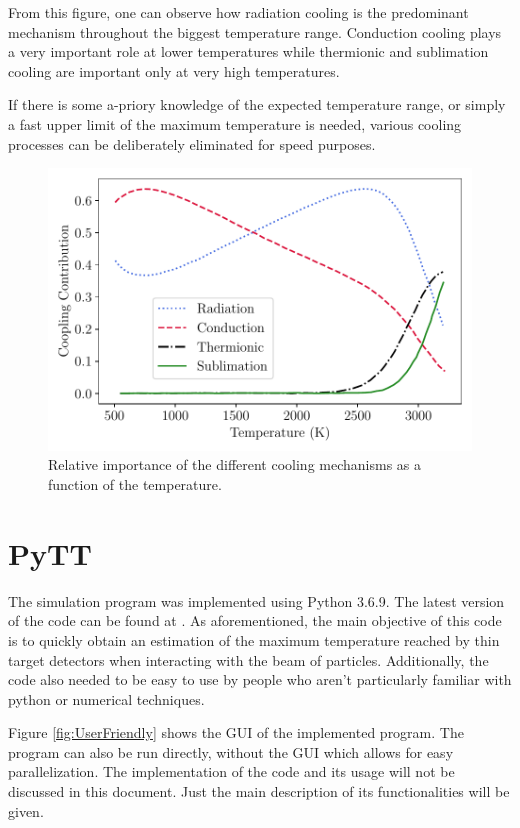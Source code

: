 From this figure, one can observe how radiation cooling is the predominant mechanism throughout the biggest temperature range. Conduction cooling plays a very important role at lower temperatures while thermionic and sublimation cooling are important only at very high temperatures. 

If there is some a-priory knowledge of the expected temperature range, or simply a fast upper limit of the maximum temperature is needed, various cooling processes can be deliberately eliminated for speed purposes.

\begin{figure}[h]
    \centering
    \includegraphics[width=0.60\columnwidth]{PlotCoolingImportancfe/CoolingImpo.pdf}
    \caption{Relative importance of the different cooling mechanisms as a function of the temperature.}
    \label{fig:CoolingComparison}
\end{figure}

\section{PyTT}

The simulation program was implemented using Python 3.6.9. The latest version of the code can be found at \parencite[][]{ref:GitAra}. As aforementioned, the main objective of this code is to quickly obtain an estimation of the maximum temperature reached by thin target detectors when interacting with the beam of particles. Additionally, the code also needed to be easy to use by people who aren't particularly familiar with python or numerical techniques.

Figure \ref{fig:UserFriendly} shows the GUI of the implemented program. The program can also be run directly, without the GUI which allows for easy parallelization. The implementation of the code and its usage will not be discussed in this document. Just the main description of its functionalities will be given. 

